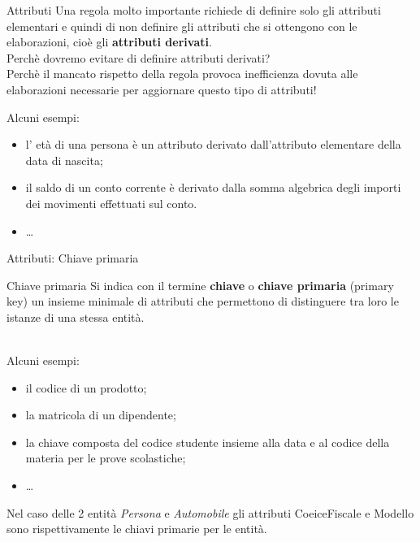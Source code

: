 %
\begin{frame}{Attributi}
Una regola molto importante  richiede di definire solo gli attributi elementari e quindi di non definire gli attributi che si ottengono con le elaborazioni, cio\`e gli \textbf{attributi derivati}.
\pause
\newline
\\Perch\`e dovremo evitare di definire attributi derivati?
\pause
\newline
\\Perch\`e il mancato rispetto della regola provoca inefficienza dovuta alle elaborazioni necessarie per aggiornare questo tipo di attributi!
\pause

Alcuni esempi:
\begin{itemize}
    \item l' et\`a di una persona \`e un attributo derivato dall'attributo elementare della data di nascita;
    \item il saldo di un conto corrente \`e derivato dalla somma algebrica degli importi dei movimenti effettuati sul conto.
    \item \ldots
\end{itemize}
\end{frame}
%
\begin{frame}{Attributi: Chiave primaria}
\vspace{-.9cm}

\begin{minipage}{0.9\textwidth}
\begin{block}{Chiave primaria}
Si indica con il termine \textbf{chiave} o \textbf{chiave primaria} (primary key) un insieme minimale di attributi che permettono di distinguere tra loro le istanze di una stessa entit\`a.
\end{block}
\end{minipage}
\pause
\newline
\\Alcuni esempi:
\begin{itemize}[<+->]
    \item il codice di un prodotto;
    \item la matricola di un dipendente;
    \item la chiave composta del codice studente insieme alla data e al codice della materia per le prove scolastiche;
    \item \ldots
\end{itemize}
\pause

Nel caso delle 2 entit\`a \textit{Persona} e \textit{Automobile} gli attributi CoeiceFiscale e Modello sono rispettivamente le chiavi primarie per le entit\`a.
\end{frame}
